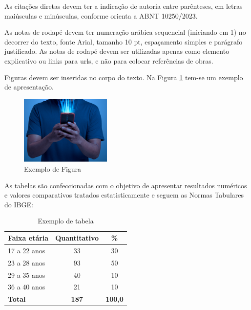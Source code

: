 \documentclass[
	article,			%
	11pt,				%
	oneside,			%
	a4paper,			%
	english,			%
	brazil,				%
	sumario=tradicional
]{abntex2}
\begin{document}
As citações diretas devem ter a indicação de autoria entre parênteses, em letras
maiúsculas e minúsculas, conforme orienta a ABNT 10250/2023.

As notas de rodapé devem ter numeração arábica sequencial (iniciando em 1) no
decorrer do texto, fonte Arial, tamanho 10 pt, espaçamento simples e parágrafo
justificado. As notas de rodapé devem ser utilizadas apenas como elemento
explicativo ou links para urls, e não para colocar referências de obras.

Figuras devem ser inseridas no corpo do texto. Na Figura \ref{fig:figura} tem-se
um exemplo de apresentação.

\begin{figure}[h]
    \centering
    \caption{Exemplo de Figura}
    \label{fig:figura}
    \includegraphics[width=0.4\textwidth]{imgs/fig.png}
\end{figure}

As tabelas são confeccionadas com o objetivo de apresentar resultados numéricos
e valores comparativos tratados estatisticamente e seguem as Normas Tabulares do
IBGE:

\begin{table}[h]
    \centering
    \caption{Exemplo de tabela}
    \label{tab:tabela}
    \setlength{\tabcolsep}{16pt}
    \begin{tabular}{l c c}
        \toprule
        \textbf{Faixa etária} & \textbf{Quantitativo} & \textbf{\%} \\
        \midrule
        17 a 22 anos & 33  & 30   \\
        23 a 28 anos & 93  & 50   \\
        29 a 35 anos & 40  & 10   \\
        36 a 40 anos & 21  & 10   \\
        \midrule
        \textbf{Total} & \textbf{187} & \textbf{100,0} \\
        \bottomrule
    \end{tabular}
\end{table}
\end{document}
